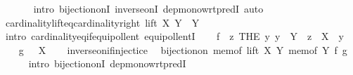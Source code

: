 \begin{isabellebody}
\ \ \ \ \ \isamarkupfalse%
\ {\isacharparenleft}{\kern0pt}intro\ bijection{\isacharunderscore}{\kern0pt}onI\ inverse{\isacharunderscore}{\kern0pt}onI\ dep{\isacharunderscore}{\kern0pt}mono{\isacharunderscore}{\kern0pt}wrt{\isacharunderscore}{\kern0pt}predI{\isacharparenright}{\kern0pt}\ auto\isanewline
\ \isamarkupfalse%
%
\endisatagproof
{\isafoldproof}%
%
\isadelimproof
\isanewline
%
\endisadelimproof
\isanewline
{}\isamarkupfalse%
\ cardinality{\isacharunderscore}{\kern0pt}lift{\isacharunderscore}{\kern0pt}eq{\isacharunderscore}{\kern0pt}cardinality{\isacharunderscore}{\kern0pt}right{\isacharcolon}{\kern0pt}\ {\isachardoublequoteopen}{\isacharbar}{\kern0pt}lift\ X\ Y{\isacharbar}{\kern0pt}\ {\isacharequal}{\kern0pt}\ {\isacharbar}{\kern0pt}Y{\isacharbar}{\kern0pt}{\isachardoublequoteclose}\isanewline
%
\isadelimproof
%
\endisadelimproof
%
\isatagproof
{}\isamarkupfalse%
\ {\isacharparenleft}{\kern0pt}intro\ cardinality{\isacharunderscore}{\kern0pt}eq{\isacharunderscore}{\kern0pt}if{\isacharunderscore}{\kern0pt}equipollent\ equipollentI{\isacharparenright}{\kern0pt}\isanewline
\ \ \isamarkupfalse%
\ {\isacharquery}{\kern0pt}f\ {\isacharequal}{\kern0pt}\ {\isachardoublequoteopen}{\isasymlambda}z{\isachardot}{\kern0pt}\ THE\ y{\isachardot}{\kern0pt}\ y\ {\isasymin}\ Y\ {\isasymand}\ z\ {\isacharequal}{\kern0pt}\ X\ {\isacharplus}{\kern0pt}\ y{\isachardoublequoteclose}\isanewline
\ \ \isamarkupfalse%
\ {\isacharquery}{\kern0pt}g\ {\isacharequal}{\kern0pt}\ {\isachardoublequoteopen}{\isacharparenleft}{\kern0pt}{\isacharparenleft}{\kern0pt}{\isacharplus}{\kern0pt}{\isacharparenright}{\kern0pt}\ X{\isacharparenright}{\kern0pt}{\isachardoublequoteclose}\isanewline
\ \ \isamarkupfalse%
\ inverse{\isacharunderscore}{\kern0pt}on{\isacharunderscore}{\kern0pt}if{\isacharunderscore}{\kern0pt}injectice\ \isamarkupfalse%
\ {\isachardoublequoteopen}bijection{\isacharunderscore}{\kern0pt}on\ {\isacharparenleft}{\kern0pt}mem{\isacharunderscore}{\kern0pt}of\ {\isacharparenleft}{\kern0pt}lift\ X\ Y{\isacharparenright}{\kern0pt}{\isacharparenright}{\kern0pt}\ {\isacharparenleft}{\kern0pt}mem{\isacharunderscore}{\kern0pt}of\ Y{\isacharparenright}{\kern0pt}\ {\isacharquery}{\kern0pt}f\ {\isacharquery}{\kern0pt}g{\isachardoublequoteclose}\isanewline
\ \ \ \ \isamarkupfalse%
\ {\isacharparenleft}{\kern0pt}intro\ bijection{\isacharunderscore}{\kern0pt}onI\ dep{\isacharunderscore}{\kern0pt}mono{\isacharunderscore}{\kern0pt}wrt{\isacharunderscore}{\kern0pt}predI{\isacharparenright}{\kern0pt}\isanewline

\end{isabellebody}
